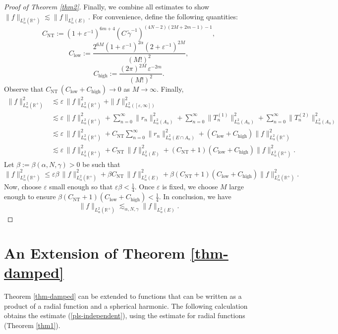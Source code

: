 \documentclass[11pt,a4paper,reqno,dvipsnames]{amsart}
\newcommand{\ep}{\varepsilon}
\newcommand{\R}{\mathbb R}
\renewcommand{\le}{\leqslant}
\numberwithin{equation}{section}
\theoremstyle{plain}
\theoremstyle{definition}
\theoremstyle{remark}
\begin{document}
\begin{proof}[Proof of Theorem \ref{thm2}]
Finally, we combine all estimates to show $\|f\|_{L^2_\alpha(\R^+)} \lesssim \|f\|_{L^2_\alpha(E)}$. For convenience, define the following quantities:
$$C_{\text{NT}} := (1 + \ep^{-1})^{6m+4}\left(C\,\widetilde\gamma^{-1} \right)^{(4N-2)(2M + 2m - 1) - 1},$$
$$C_{\text{low}} := \frac{2^{6M}(1 + \ep^{-1})^{2\alpha} (2 + \ep^{-1})^{2M}}{(M!)^2},$$
$$C_{\text{high}} := \frac{(2\pi)^{2M}\, \ep^{-2m}}{(M!)^2}.$$
Observe that $C_{\text{NT}}\,(C_{\text{low}} + C_{\text{high}}) \to 0$ as $M\to\infty$. Finally,
\begin{align*}
\|f\|_{L^2_\alpha(\R^+)}^2 &\lesssim \ep\, \|f\|_{L^2_\alpha(\R^+)}^2 + \|f\|^2_{L^2_\alpha([\ep, \infty])}\\
&\lesssim \ep\, \|f\|_{L^2_\alpha(\R^+)}^2 + \sum_{n=0}^\infty \|r_n\|^2_{L^2_\alpha(A_n)} + \sum_{n=0}^\infty \|T_n^{(1)}\|^2_{L^2_\alpha(A_n)} + \sum_{n=0}^\infty \|T_n^{(2)}\|^2_{L^2_\alpha(A_n)}\\
&\lesssim \ep\, \|f\|_{L^2_\alpha(\R^+)}^2 + C_{\text{NT}} \sum_{n=0}^\infty \|r_n\|^2_{L^2_\alpha(E\cap A_n)} + (C_{\text{low}} + C_{\text{high}}) \|f\|^2_{L^2_\alpha(\R^+)}\\
&\lesssim \ep\, \|f\|_{L^2_\alpha(\R^+)}^2 +  C_{\text{NT}}\, \|f\|^2_{L^2_\alpha(E)} + (C_{\text{NT}} + 1)(C_{\text{low}} + C_{\text{high}}) \|f\|^2_{L^2_\alpha(\R^+)}.
\end{align*}
Let $\beta := \beta(\alpha, N, \gamma) > 0$ be such that
$$\|f\|_{L^2_\alpha(\R^+)}^2  \le \ep\beta\, \|f\|_{L^2_\alpha(\R^+)}^2 +  \beta C_{\text{NT}}\, \|f\|^2_{L^2_\alpha(E)} + \beta (C_{\text{NT}} + 1)(C_{\text{low}} + C_{\text{high}}) \|f\|^2_{L^2_\alpha(\R^+)}.$$
Now, choose $\ep$ small enough so that $\ep \beta < \frac{1}{4}$. Once $\ep$ is fixed, we choose $M$ large enough to ensure $\beta (C_{\text{NT}} + 1)(C_{\text{low}} + C_{\text{high}}) < \frac{1}{4}$. In conclusion, we have 
$$\|f\|_{L^2_\alpha(\R^+)} \lesssim_{\alpha, N, \gamma} \|f\|_{L^2_\alpha(E)}.$$

\end{proof}

\section{An Extension of Theorem \ref{thm-damped}}

Theorem \ref{thm-damped} can be extended to functions that can be written as a product of a radial function and a spherical harmonic. The following calculation obtains the estimate (\ref{pls-independent}), using the estimate for radial functions (Theorem \ref{thm1}). 
\end{document}
